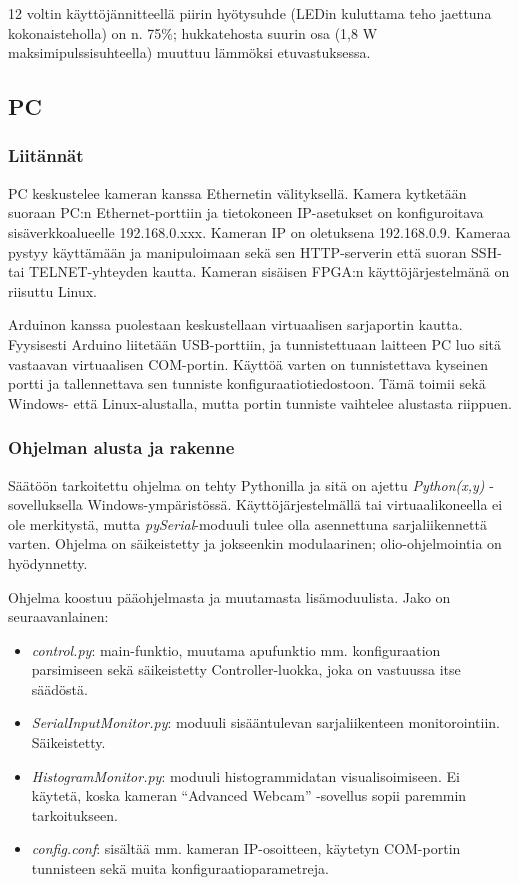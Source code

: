 \documentclass[finnish,12pt]{article}
\begin{document}
12 voltin käyttöjännitteellä piirin hyötysuhde (LEDin kuluttama teho jaettuna kokonaisteholla) on n. 75\%; hukkatehosta suurin osa (1,8 W maksimipulssisuhteella) muuttuu lämmöksi etuvastuksessa.

\subsection{PC}

\subsubsection{Liitännät}

PC keskustelee kameran kanssa Ethernetin välityksellä. Kamera kytketään suoraan PC:n Ethernet-porttiin ja tietokoneen IP-asetukset on konfiguroitava sisäverkkoalueelle 192.168.0.xxx. Kameran IP on oletuksena 192.168.0.9. Kameraa pystyy käyttämään ja manipuloimaan sekä sen HTTP-serverin että suoran SSH- tai TELNET-yhteyden kautta. Kameran sisäisen FPGA:n käyttöjärjestelmänä on riisuttu Linux.

Arduinon kanssa puolestaan keskustellaan virtuaalisen sarjaportin kautta. Fyysisesti Arduino liitetään USB-porttiin, ja tunnistettuaan laitteen PC luo sitä vastaavan virtuaalisen COM-portin. Käyttöä varten on tunnistettava kyseinen portti ja tallennettava sen tunniste konfiguraatiotiedostoon. Tämä toimii sekä Windows- että Linux-alustalla, mutta portin tunniste vaihtelee alustasta riippuen.

\subsubsection{Ohjelman alusta ja rakenne}

Säätöön tarkoitettu ohjelma on tehty Pythonilla ja sitä on ajettu \textit{Python(x,y)} -sovelluksella Windows-ympäristössä. Käyttöjärjestelmällä tai virtuaalikoneella ei ole merkitystä, mutta \textit{pySerial}-moduuli tulee olla asennettuna sarjaliikennettä varten. Ohjelma on säikeistetty ja jokseenkin modulaarinen; olio-ohjelmointia on hyödynnetty.

Ohjelma koostuu pääohjelmasta ja muutamasta lisämoduulista. Jako on seuraavanlainen:

\begin{itemize}
 \item \textit{control.py}: main-funktio, muutama apufunktio mm. konfiguraation parsimiseen sekä säikeistetty Controller-luokka, joka on vastuussa itse säädöstä.
 \item \textit{SerialInputMonitor.py}: moduuli sisääntulevan sarjaliikenteen monitorointiin. Säikeistetty.
 \item \textit{HistogramMonitor.py}: moduuli histogrammidatan visualisoimiseen. Ei käytetä, koska kameran ``Advanced Webcam'' -sovellus sopii paremmin tarkoitukseen.
 \item \textit{config.conf}: sisältää mm. kameran IP-osoitteen, käytetyn COM-portin tunnisteen sekä muita konfiguraatioparametreja.
\end{itemize}
\end{document}
